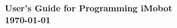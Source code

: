 \documentclass[11pt]{report}
\begin{document}
\thispagestyle{empty}
\begin{center}


\vspace{0.5in}
{\Huge\sf\bf User's Guide for Programming iMobot} \\
\vspace{2.0in}
{\large\sf\bf\today}
\end{center}

\pagebreak

\begin{abstract} 
This user's guide describes how to control an iMobot robotic module.

\end{abstract}
\pagebreak

\setcounter{page}{1}
\tableofcontents
\pagebreak

\setcounter{page}{1}
\pagebreak

\end{document}
